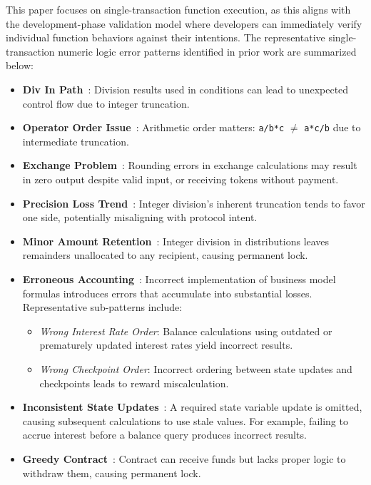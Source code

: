 \documentclass[pdflatex,sn-basic]{sn-jnl}%
\theoremstyle{thmstyleone}%
\theoremstyle{thmstyletwo}%
\theoremstyle{thmstylethree}%
\begin{document}
This paper focuses on single-transaction function execution, as this aligns with the development-phase validation model where developers can immediately verify individual function behaviors against their intentions.
The representative single-transaction numeric logic error patterns identified in prior work are summarized below:

\begin{itemize}
    \item \textbf{Div In Path}~\citep{numscout}: Division results used in conditions can lead to unexpected control flow due to integer truncation.

    \item \textbf{Operator Order Issue}~\citep{numscout}: Arithmetic order matters: \texttt{a/b*c} $\neq$ \texttt{a*c/b} due to intermediate truncation.

    \item \textbf{Exchange Problem}~\citep{numscout}: Rounding errors in exchange calculations may result in zero output despite valid input, or receiving tokens without payment.

    \item \textbf{Precision Loss Trend}~\citep{numscout}: Integer division's inherent truncation tends to favor one side, potentially misaligning with protocol intent.

    \item \textbf{Minor Amount Retention}~\citep{numscout}: Integer division in distributions leaves remainders unallocated to any recipient, causing permanent lock.

    \item \textbf{Erroneous Accounting}~\citep{gptscan, exploitablebugs}: Incorrect implementation of business model formulas introduces errors that accumulate into substantial losses. Representative sub-patterns include:
    \begin{itemize}
        \item \textit{Wrong Interest Rate Order}: Balance calculations using outdated or prematurely updated interest rates yield incorrect results.
        \item \textit{Wrong Checkpoint Order}: Incorrect ordering between state updates and checkpoints leads to reward miscalculation.
    \end{itemize}

    \item \textbf{Inconsistent State Updates}~\citep{exploitablebugs}: A required state variable update is omitted, causing subsequent calculations to use stale values. For example, failing to accrue interest before a balance query produces incorrect results.

    \item \textbf{Greedy Contract}~\citep{flyinointment}: Contract can receive funds but lacks proper logic to withdraw them, causing permanent lock.

\end{itemize}
\end{document}
